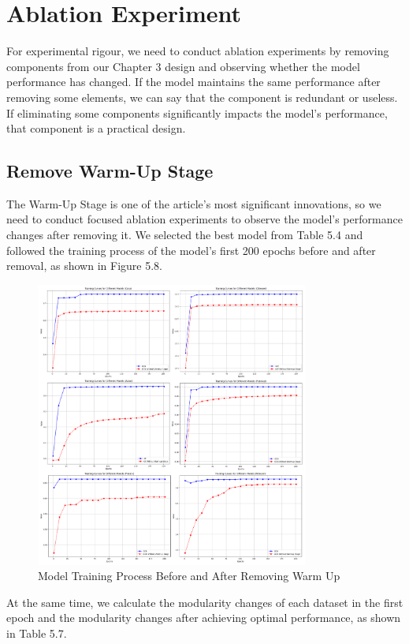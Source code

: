 \documentclass[ %
                    author={Tengyao Tu},
                supervisor={Dr. James Pope},
                    degree={MSc},
                     title={A New Perspective on Graph Community Detection: Combining Traditional Methods with Deep Learning Approaches},
                  subtitle={Applying to Telecom Networks and Diverse Datasets},
                      type={},
                      year={2024}]{dissertation}
\begin{document}
\section{Ablation Experiment}
For experimental rigour, we need to conduct ablation experiments by removing components from our Chapter 3 design and observing whether the model performance has changed. If the model maintains the same performance after removing some elements, we can say that the component is redundant or useless. If eliminating some components significantly impacts the model's performance, that component is a practical design.
\subsection{Remove Warm-Up Stage}
The Warm-Up Stage is one of the article's most significant innovations, so we need to conduct focused ablation experiments to observe the model's performance changes after removing it. We selected the best model from Table 5.4 and followed the training process of the model's first 200 epochs before and after removal, as shown in Figure 5.8.
\begin{figure}[h] %
    \centering
    \includegraphics[width=0.8\textwidth]{Figure_15.png} %
    \caption{Model Training Process Before and After Removing Warm Up}
    \label{virtual Graph Data Map}
\end{figure}
At the same time, we calculate the modularity changes of each dataset in the first epoch and the modularity changes after achieving optimal performance, as shown in Table 5.7.
\end{document}
